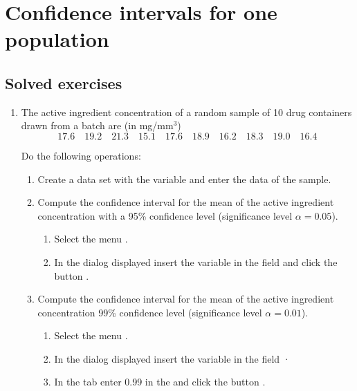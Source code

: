 
\chapter{Confidence intervals for one population}\label{cha:confidence-intervals-1}

\section{Solved exercises}
\begin{enumerate}[leftmargin=*]
\item  The active ingredient concentration of a random sample of 10 drug containers drawn from a batch are (in
mg/mm$^{3}$)
\[
17.6\quad 19.2\quad 21.3\quad 15.1\quad 17.6\quad 18.9\quad 16.2\quad 18.3\quad 19.0\quad 16.4
\]

Do the following operations:
\begin{enumerate}
\item Create a data set with the variable  and enter the data of the sample.

\item  Compute the confidence interval for the mean of the active ingredient concentration with a 95\% confidence level
(significance level $\alpha =0.05$).
\begin{indication}
\begin{enumerate}
\item Select the menu .
\item In the dialog displayed insert the variable  in the field 
and click the button .
\end{enumerate}
\end{indication}

\item Compute the confidence interval for the mean of the active ingredient concentration 99\% confidence level
(significance level $\alpha=0.01$).
\begin{indication}
\begin{enumerate}
\item Select the menu .
\item In the dialog displayed insert the variable  in the field ·
\item In the  tab enter 0.99 in the  and click the button .
\end{enumerate}
\end{indication}


\end{enumerate}
\end{enumerate}
